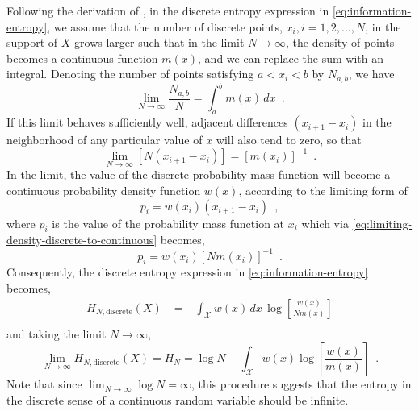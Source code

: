 Following the derivation of \textcite{jaynes_information_1957}, in the discrete entropy expression in \cref{eq:information-entropy}, we assume that the number of discrete points, $x_i, i=1,2,\dots,N$, in the support of $X$ grows larger such that in the limit $N\rightarrow\infty$, the density of points becomes a continuous function $m(x)$, and we can replace the sum with an integral. Denoting the number of points satisfying $a<x_i<b$ by $N_{a,b}$, we have
%
\begin{equation}
    \lim_{N\rightarrow\infty} \frac{N_{a,b}}{N} = \int_a^b m(x) \, dx \enspace .
\end{equation}
%
If this limit behaves sufficiently well, adjacent differences $(x_{i+1} - x_{i})$ in the neighborhood of any particular value of $x$ will also tend to zero, so that
%
\begin{equation} \label{eq:limiting-density-discrete-to-continuous}
    \lim_{N\rightarrow\infty} \left[ N(x_{i+1} - x_{i}) \right] = \left[ m(x_{i}) \right]^{-1} \enspace .
\end{equation}
%
In the limit, the value of the discrete probability mass function will become a continuous probability density function $w(x)$, according to the limiting form of
%
\begin{equation}
    p_i = w(x_i)\left(x_{i+1} - x_{i}\right) \enspace ,
\end{equation}
%
where $p_i$ is the value of the probability mass function at $x_i$ which via \cref{eq:limiting-density-discrete-to-continuous} becomes,
%
\begin{equation}
    p_i = w(x_i)\left[Nm(x_i)\right]^{-1} \enspace .
\end{equation}
%
Consequently, the discrete entropy expression in \cref{eq:information-entropy} becomes,
\begin{align}
    H_{N,\text{discrete}}(X) &= - \int_\mathcal{X} w(x) \, dx \, \log \left[\frac{w(x)}{Nm(x)}\right] \nonumber \\
\end{align}
%
and taking the limit $N\rightarrow\infty$,
%
\begin{equation}
    \lim_{N\rightarrow\infty} H_{N,\text{discrete}}(X) = H_{N} = \log N - \int_\mathcal{X} w(x) \log \left[\frac{w(x)}{m(x)}\right] \enspace .
\end{equation}
%
Note that since $\lim_{N\rightarrow\infty} \log N = \infty$, this procedure suggests that the entropy in the discrete sense of a continuous random variable should be infinite.





